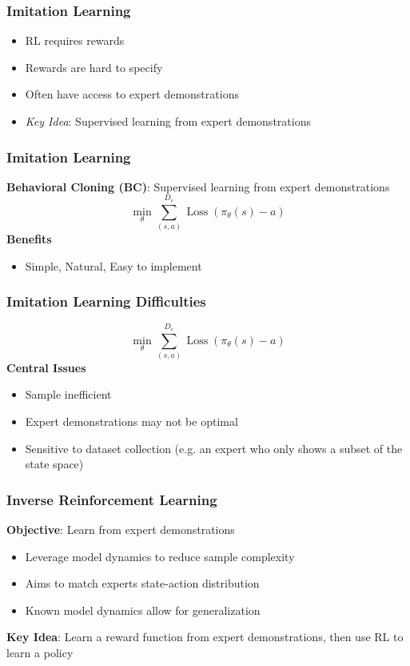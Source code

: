 \documentclass{beamer}
\DeclareMathOperator{\loss}{Loss}
\begin{document}
\begin{frame}
\frametitle{Imitation Learning}
	\begin{itemize}
		\item RL requires rewards
		\vfill
		\item Rewards are hard to specify
		\vfill
		\item Often have access to expert demonstrations
		\vfill
		\item \emph{Key Idea}: Supervised learning from expert demonstrations
	\end{itemize}
\end{frame}

\begin{frame}
\frametitle{Imitation Learning}
	\textbf{Behavioral Cloning (BC)}: Supervised learning from expert demonstrations
	\[ 
		\min_{\theta} \sum_{(s,a)}^{D_e} \loss \left(\pi_\theta(s) - a \right)
	\]
	\vfill
	\textbf{Benefits}
	\begin{itemize}
		\item Simple, Natural, Easy to implement
	\end{itemize}
\end{frame}

\begin{frame}
	\frametitle{Imitation Learning Difficulties}
	\[ 
		\min_{\theta} \sum_{(s,a)}^{D_e} \loss \left(\pi_\theta(s) - a \right)
	\]
	\vfill
	\textbf{Central Issues}
	\begin{itemize}
		\item Sample inefficient
		\item Expert demonstrations may not be optimal
		\item Sensitive to dataset collection (e.g. an expert who only shows a subset of the state space)
	\end{itemize}
\end{frame}

\begin{frame}
	\frametitle{Inverse Reinforcement Learning}
	\textbf{Objective}: Learn from expert demonstrations
	\begin{itemize}
		\item Leverage model dynamics to reduce sample complexity
		\item Aims to match experts state-action distribution
		\item Known model dynamics allow for generalization
	\end{itemize}
	\vfill
	\textbf{Key Idea}: Learn a reward function from expert demonstrations, then use RL to learn a policy
\end{frame}
\end{document}

